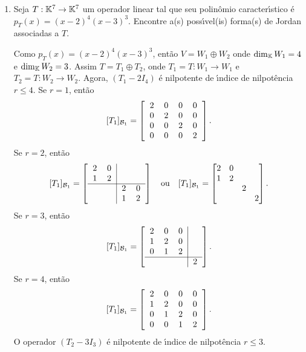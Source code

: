 \begin{exemplo}
	\begin{enumerate}
		\item Seja $T : \mathbb{K}^7 \to \mathbb{K}^7$ um operador linear tal que seu polin\^omio caracter{\'\i}stico \'e $p_T(x) = (x - 2)^4(x - 3)^3$. Encontre a(s) poss{\'\i}vel(is) forma(s) de Jordan associadas a $T$.
		\begin{solucao}
			Como $p_T(x) = (x - 2)^4(x - 3)^3$, ent\~ao $V = W_1 \oplus W_2$ onde $\dim_{\mathbb{K}}W_1 = 4$ e $\dim_{\mathbb{K}}W_2 = 3$. Assim $T = T_1 \oplus T_2$, onde $T_1 = T : W_1 \to W_1$ e $T_2 = T : W_2 \to W_2$. Agora, $(T_1 - 2I_4)$ \'e nilpotente de {\'\i}ndice de nilpot\^encia $r \le 4$.
			Se $r = 1$, ent\~ao
			\[
				[T_1]_{\mathcal{B}_1} = \left[\begin{tabular}{cccc}
 					2 & 0 & 0 & 0\\
 					0 & 2 & 0 & 0\\
 					0 & 0 & 2 & 0 \\
 					0 & 0 & 0 & 2
				\end{tabular}
				\right].
			\]
			Se $r = 2$, ent\~ao
			\[
				[T_1]_{\mathcal{B}_1} = \left[\begin{tabular}{cc|cc}
 					2 & 0 &  & \\
 					1 & 2 &  & \\ \cline{1-4}
 					&  & 2 & 0 \\
 					&  & 1 & 2
 				\end{tabular}
				\right]\quad \mbox{ou}\quad [T_1]_{\mathcal{B}_1} = \begin{bmatrix}
 					2 & 0 &  & \\
 					1 & 2 &  & \\
 					&  & 2 &  \\
 					&  &  & 2
 				\end{bmatrix}.
			\]
			Se $r = 3$, ent\~ao
			\[
				[T_1]_{\mathcal{B}_1} = \left[\begin{tabular}{ccc|c}
 						2 & 0 & 0 & \\
 						1 & 2 & 0 & \\
 						0 & 1 & 2 & \\ \cline{1-4}
 						&  &  & 2
					\end{tabular}
				\right].
			\]
			Se $r = 4$, ent\~ao
			\[
				[T_1]_{\mathcal{B}_1} = \left[\begin{tabular}{ccccc}
 						2 & 0 & 0 & 0\\
 						1 & 2 & 0 & 0\\
 						0 & 1 & 2 & 0\\
 						0 & 0 & 1 & 2
					\end{tabular}
				\right].
			\]
			O operador $(T_2 - 3I_3)$ \'e nilpotente de {\'\i}ndice de nilpot\^encia $r \le 3$.


\end{solucao}
\end{enumerate}
\end{exemplo}
